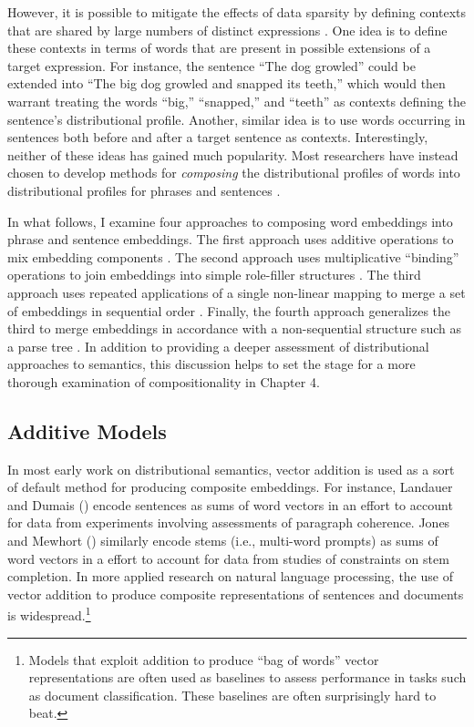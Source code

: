 However, it is possible to mitigate the effects of data sparsity by defining contexts that are shared by large numbers of distinct expressions \citep[][p. 261]{Baroni:2014}. One idea is to define these contexts in terms of words that are present in possible extensions of a target expression. For instance, the sentence ``The dog growled'' could be extended into ``The big dog growled and snapped its teeth,'' which would then warrant treating the words ``big,'' ``snapped,'' and ``teeth'' as contexts defining the sentence's distributional profile. Another, similar idea is to use words occurring in sentences both before and after a target sentence as contexts. Interestingly, neither of these ideas has gained much popularity. Most researchers have instead chosen to develop methods for \textit{composing} the distributional profiles of words into distributional profiles for phrases and sentences \citep{Mitchell:2010,Baroni:2014}.

In what follows, I examine four approaches to composing word embeddings into phrase and sentence embeddings. The first approach uses additive operations to mix embedding components \citep{Mitchell:2010,Mikolov:2013}. The second approach uses multiplicative ``binding'' operations to join embeddings into simple role-filler structures \citep{SmolenskyLegendre:2006,Plate:2003,Eliasmith:2013,Smolensky:1990}. The third approach uses repeated applications of a single non-linear mapping to merge a set of embeddings in sequential order \citep{Elman:1990,Elman:1991}. Finally, the fourth approach generalizes the third to merge embeddings in accordance with a non-sequential structure such as a parse tree \citep{Socher:2014,Socher:2011,Tai:2015,Socher:2012,Iyyer:2014,Bottou:2014}. In addition to providing a deeper assessment of distributional approaches to semantics, this discussion helps to set the stage for a more thorough examination of compositionality in Chapter 4. 

\subsection{Additive Models}

In most early work on distributional semantics, vector addition is used as a sort of default method for producing composite embeddings. For instance, Landauer and Dumais (\citeyear{LandauerDumais:1997}) encode sentences as sums of word vectors in an effort to account for data from experiments involving assessments of paragraph coherence. Jones and Mewhort (\citeyear{JonesMewhort:2007}) similarly encode stems (i.e., multi-word prompts) as sums of word vectors in a effort to account for data from studies of constraints on stem completion. In more applied research on natural language processing, the use of vector addition to produce composite representations of sentences and documents is widespread.\footnote{Models that exploit addition to produce ``bag of words'' vector representations are often used as baselines to assess performance in tasks such as document classification. These baselines are often surprisingly hard to beat.} 

